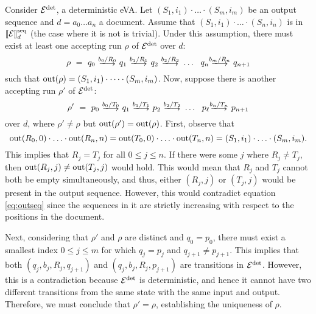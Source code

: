 Consider $\mathcal{E}^{{\operatorname{det}}}$, a deterministic eVA. Let $(S_1, i_1)\cdot \ldots \cdot (S_m, i_m)$ be an output sequence and $d = a_0\ldots a_n$ a document. Assume that $(S_1, i_1)\cdot \ldots \cdot (S_n, i_n)$ is in $\llbracket\mathcal{E}\rrbracket^{\operatorname{seq}}_d$ (the case where it is not is trivial). Under this assumption, there must exist at least one accepting run $\rho$ of $\mathcal{E}^{{\operatorname{det}}}$ over $d$:
$$
\rho \ = \ q_0 \ \longtrans{b_0 / R_0} \ q_1 \ \longtrans{b_1 / R_1} \ q_2 \ \longtrans{b_2 / R_2} \ \ldots \ \ q_{n} \longtrans{b_{m} / R_n} \ q_{n+1}
$$
such that $\operatorname{out}(\rho) = (S_1, i_1)\cdot \cdots \cdot (S_m, i_m)$. Now, suppose there is another accepting run $\rho'$ of $\mathcal{E}^{{\operatorname{det}}}$:
$$
\rho' \ = \ p_0 \ \longtrans{b_0 / T_0} \ q_1 \ \longtrans{b_1 / T_1} \ p_2 \ \longtrans{b_2 / T_2} \ \ldots \ \ p_{\ell} \longtrans{b_n / T_n} \ p_{n+1}
$$
over $d$, where $\rho' \neq \rho$ but $\operatorname{out}(\rho') = \operatorname{out}(\rho)$. First, observe that
\begin{equation} \label{eq:outseq}
\operatorname{out}(R_0, 0)\cdot \ldots \cdot \operatorname{out}(R_n, n) = \operatorname{out}(T_0, 0)\cdot \ldots \cdot \operatorname{out}(T_n, n) = (S_1, i_1)\cdot \ldots \cdot (S_m, i_m).
\end{equation}
This implies that $R_j = T_j$ for all $0 \leq j \leq n$. If there were some $j$ where $R_j \neq T_j$, then $\operatorname{out}(R_j, j) \neq \operatorname{out}(T_j, j)$ would hold. This would mean that $R_j$ and $T_j$ cannot both be empty simultaneously, and thus, either $(R_j, j)$ or $(T_j, j)$ would be present in the output sequence. However, this would contradict equation \eqref{eq:outseq} since the sequences in it are strictly increasing with respect to the positions in the document.

Next, considering that $\rho'$ and $\rho$ are distinct and $q_0 = p_0$, there must exist a smallest index $0 \leq j \leq m$ for which $q_j = p_j$ and $q_{j+1} \neq p_{j+1}$. This implies that both $(q_j, b_j, R_j, q_{j+1})$ and $(q_j, b_j, R_j, p_{j+1})$ are transitions in $\mathcal{E}^{\operatorname{det}}$. However, this is a contradiction because $\mathcal{E}^{{\operatorname{det}}}$ is deterministic, and hence it cannot have two different transitions from the same state with the same input and output. Therefore, we must conclude that $\rho' = \rho$, establishing the uniqueness of $\rho$.